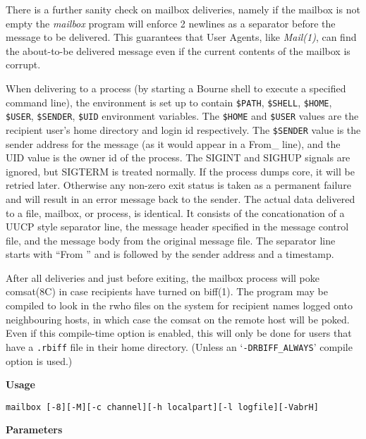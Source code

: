 There is a further sanity check on mailbox deliveries, namely if
the mailbox is not empty the {\em mailbox\/} program will
enforce 2 newlines as a separator before the message to be 
delivered. This guarantees that User Agents, like {\em Mail(1)\/},
can find the about-to-be delivered message even  if the current
contents of the mailbox is corrupt.

When delivering to a process (by starting a Bourne shell to 
execute a specified command line), the environment is set up to 
contain {\tt \$PATH}, {\tt \$SHELL}, {\tt \$HOME}, 
{\tt \$USER},
{\tt \$SENDER},  {\tt \$UID} environment variables. The 
{\tt \$HOME} and {\tt \$USER} values are the recipient user's home
directory and login id respectively. The {\tt \$SENDER} value is
the sender address for the message (as it would appear in a From\_
line), and the UID value is the owner id of the process. The
SIGINT and SIGHUP signals are ignored, but SIGTERM is treated
normally. If the process dumps core, it will be retried later.
Otherwise any non-zero exit status is taken as a permanent 
failure and will result in an error message back to the sender.
The actual data delivered to a file, mailbox,  or process, is
identical. It  consists of the concationation of a UUCP style
separator line, the message header specified in the message 
control file, and the message body from the original message file.
The separator line starts with ``From '' and is followed by the
sender address and a timestamp.

After all deliveries and just before exiting, the mailbox process
will poke comsat(8C) in case recipients have turned on biff(1).
The program may be compiled to look in the rwho files on the 
system for recipient names logged onto neighbouring hosts, in which
case the comsat on the remote host will be poked. Even if this
compile-time option is enabled, this will only be done for users
that have a {\tt .rbiff} file in their home directory. (Unless an
`{\tt -DRBIFF\_ALWAYS}' compile option is used.)

{\bf Usage}

\begin{verbatim}
mailbox [-8][-M][-c channel][-h localpart][-l logfile][-VabrH] 
\end{verbatim}


{\bf Parameters}

